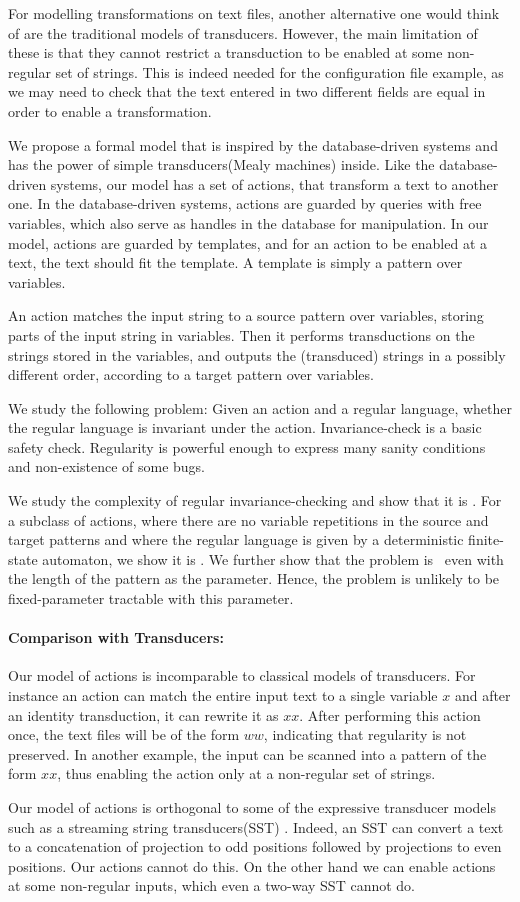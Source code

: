 For modelling transformations on text files, another alternative one would think of are the traditional models of transducers. However, the main limitation of these is that they cannot restrict a transduction to be enabled at some non-regular set of strings. This is indeed needed for the configuration file example, as we may need to check that the text entered in two different fields are equal in order to enable a transformation. 
 
We propose a formal model that is inspired by the database-driven systems and has the power of simple transducers(Mealy machines) inside. Like the database-driven systems, our model has a set of actions, that transform a text to another one. In the database-driven systems, actions are guarded by queries with free variables, which also serve as handles in the database for manipulation. In our model, actions are guarded by templates, and for an action to be enabled at a text, the text should fit the template. A template is simply a pattern over variables. 

An action matches the input string to a source pattern over variables, storing parts of the input string in variables. Then it performs transductions on the strings stored in the variables, and outputs the (transduced) strings in a possibly different order, according to a target pattern over variables. 

We study the following problem: Given an action and a regular language, whether the regular language is invariant under the action. Invariance-check is a basic safety check. Regularity is powerful enough to express many sanity conditions and non-existence of some bugs.

We study the complexity of regular invariance-checking and show that it is \pspc. For a subclass of actions, where there are no variable repetitions in the source and target patterns and where the regular language is given by a deterministic finite-state automaton, we show it is \conpc. We further show that the problem is \woneh\ even with the length of the pattern as the parameter. Hence, the problem is unlikely to be fixed-parameter tractable with this parameter. 

\paragraph*{Comparison with Transducers: }Our model of actions is incomparable to classical models of transducers. For instance an action can match the entire input text to a single variable $x$ and after an identity transduction, it can rewrite it as $xx$. After performing this action once, the text files will be of the form $ww$, indicating that regularity is not preserved. In another example, the input can be scanned into a pattern of the form $xx$, thus enabling the action only at a non-regular  set of strings. 

Our model of actions is orthogonal to some of the expressive transducer models such as a streaming string transducers(SST) \cite{A2011}. Indeed, an SST can convert a text to a concatenation of projection to odd positions followed by projections to even positions. Our actions cannot do this. On the other hand we can enable actions at some non-regular inputs, which even a two-way SST cannot do. 
